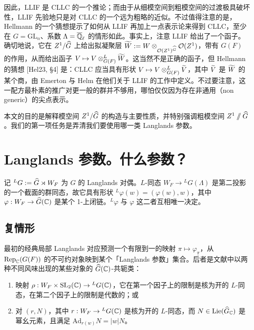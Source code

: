 
因此，LLIF 是 CLLC 的一个推论；而由于从细模空间到粗模空间的过渡极具破坏性，LLIF 先验地只是对 CLLC 的一个远为粗略的近似。不过值得注意的是，Hellmann 的一个猜想提示了如何从 LLIF 再加上一点表示论来得到 CLLC，至少在 $G=\mathrm{GL}_n$、系数 $\Lambda=\overline{\mathbb{Q}}_\ell$ 的情形如此。事实上，注意 LLIF 给出了一个函子。确切地说，它在 $Z^1/\widehat{G}$ 上给出拟凝聚层 $\widetilde W:=W\otimes_{\mathcal{O}(Z^1)^{\widehat{G}}}\mathcal{O}(Z^1)$，带有 $G(F)$ 的作用，从而给出函子 $V\mapsto V\otimes^L_{G(F)}\widetilde W$。这当然不是正确的函子，但 Hellmann 的猜想 [Hel23, §4] 是：CLLC 应当具有形状 $V\mapsto V\otimes^L_{G(F)}\widetilde V$，其中 $\widetilde V$ 是 $\widetilde W$ 的某个商，由 Emerton 与 Helm 在他们关于 LLIF 的工作中定义。不过要注意，这一配方最朴素的推广对更一般的群并不够用，哪怕仅仅因为存在非通用（non generic）的尖点表示。

本文的目的是解释模空间 $Z^1/\widehat{G}$ 的构造与主要性质，并特别强调粗模空间 $Z^1\sslash\widehat{G}$。我们的第一项任务是弄清我们要使用哪一类 Langlands 参数。

\section{Langlands 参数。什么参数？}

记 ${}^LG:=\widehat{G}\rtimes W_F$ 为 $G$ 的 Langlands 对偶。$L$-同态 $W_F\to{}^LG(\Lambda)$ 是第二投影的一个截面的群同态，故它具有形状 ${}^L\varphi(w)=(\varphi(w),w)$，其中 $\varphi:W_F\to\widehat{G}(\mathbb{C})$ 是某个 1-上闭链。${}^L\varphi$ 与 $\varphi$ 这二者互相唯一决定。

\subsection{复情形}

最初的经典局部 Langlands 对应预测一个有限到一的映射 $\pi\mapsto\varphi_\pi$，从 $\operatorname{Rep}_{\mathbb{C}}(G(F))$ 的不可约对象映到某个「Langlands 参数」集合。后者是文献中以两种不同风味出现的某些对象的 $\widehat{G}(\mathbb{C})$-共轭类：

\begin{enumerate}[label=(\arabic*),leftmargin=2.6em,itemsep=0.2em]
\item 映射 $\rho:W_F\times\mathrm{SL}_2(\mathbb{C})\to{}^LG(\mathbb{C})$，它在第一个因子上的限制是核为开的 $L$-同态，在第二个因子上的限制是代数的；或
\item 对 $(r,N)$，其中 $r:W_F\to{}^LG(\mathbb{C})$ 是核为开的 $L$-同态，而 $N\in\mathrm{Lie}(\widehat{G}_{\mathbb{C}})$ 是幂幺元素，且满足 $\mathrm{Ad}_{r(w)}N=|w|N$。
\end{enumerate}

